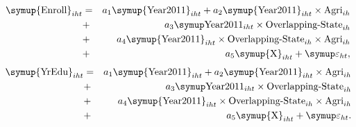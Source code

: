 \documentclass[12pt,letterpaper]{article}
\newcommand{\0}{\ensuremath{\mbox{\boldmath $0$}}}
\begin{document}
\begin{eqnarray}
	\textnormal\symup {Enroll}_{iht} & = &
    a_1 \textnormal\symup {Year2011}_{iht}
    + a_2 \textnormal\symup {Year2011}_{iht}\times\textnormal{Agri}_{ih} \nonumber\\
    &+& a_3 \textnormal\symup  \textnormal{Year2011}_{iht}\times\textnormal{Overlapping-State}_{ih} \nonumber\\
    &+& a_4 \textnormal\symup {Year2011}_{iht}\times \textnormal{Overlapping-State}_{ih}\times\textnormal{Agri}_{ih}   \nonumber \\
    &+& a_5\textnormal\symup {X}_{iht} +\symup\varepsilon_{ht}, \label{diff_enroll}
\end{eqnarray}
\begin{eqnarray}
	\textnormal\symup {YrEdu}_{iht} & = &
    a_1 \textnormal\symup {Year2011}_{iht}
    + a_2 \textnormal\symup {Year2011}_{iht}\times\textnormal{Agri}_{ih} \nonumber\\
    &+& a_3 \textnormal\symup  \textnormal{Year2011}_{iht}\times\textnormal{Overlapping-State}_{ih} \nonumber\\
    &+& a_4 \textnormal\symup {Year2011}_{iht}\times \textnormal{Overlapping-State}_{ih}\times\textnormal{Agri}_{ih}   \nonumber \\
    &+& a_5\textnormal\symup {X}_{iht} + \symup\varepsilon_{ht}. \label{diff_edu}
\end{eqnarray}


 
\end{document}
